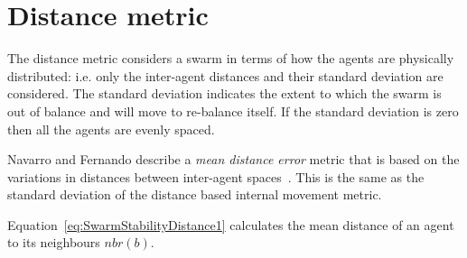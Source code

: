 \documentclass{ieeeaccess}
\begin{document}
\section{Distance metric}\label{Section:DistanceDynamics}
The distance metric considers a swarm in terms of how the agents are physically distributed: i.e. only the inter-agent distances and their standard deviation are considered. The standard deviation indicates the extent to which the swarm is out of balance and will move to re-balance itself. If the standard deviation is zero then all the agents are evenly spaced. 


Navarro and Fernando describe a \textit{mean distance error} metric that is based on the variations in distances between inter-agent spaces~\cite{NIM:09}. This is the same as the standard deviation of the distance based internal movement metric. 



Equation~\ref{eq:SwarmStabilityDistance1} calculates the mean distance of an agent to its neighbours $nbr(b)$. 
\end{document}
